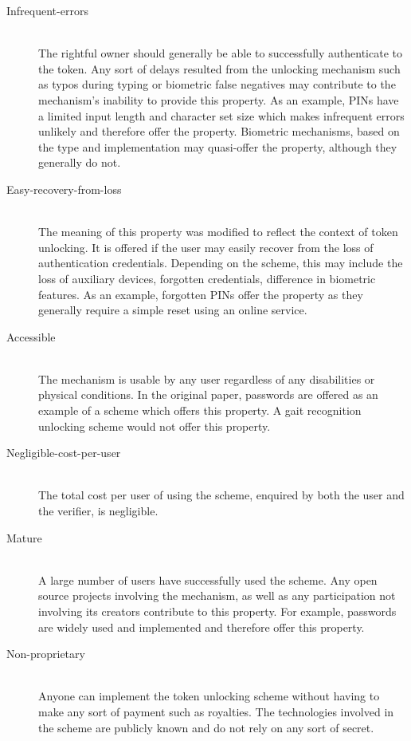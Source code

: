 \begin{description}
  \item[Infrequent-errors] \hfill \\
  The rightful owner should generally be able to successfully authenticate to the token. Any sort of delays resulted from the unlocking mechanism such as typos during typing or biometric false negatives may contribute to the mechanism's inability to provide this property. As an example, PINs have a limited input length and character set size which makes infrequent errors unlikely and therefore offer the property. Biometric mechanisms, based on the type and implementation may quasi-offer the property, although they generally do not.
    
  \item[Easy-recovery-from-loss] \hfill \\ 
  The meaning of this property was modified to reflect the context of token unlocking. It is offered if the user may easily recover from the loss of authentication credentials. Depending on the scheme, this may include the loss of auxiliary devices, forgotten credentials, difference in biometric features. As an example, forgotten PINs offer the property as they generally require a simple reset using an online service.
  
  \item[Accessible] \hfill \\
  The mechanism is usable by any user regardless of any disabilities or physical conditions. In the original paper, passwords are offered as an example of a scheme which offers this property. A gait recognition unlocking scheme would not offer this property. 
  
  \item[Negligible-cost-per-user] \hfill \\
  The total cost per user of using the scheme, enquired by both the user and the verifier, is negligible.
  
  \item[Mature] \hfill \\
  A large number of users have successfully used the scheme. Any open source projects involving the mechanism, as well as any participation not involving its creators contribute to this property. For example, passwords are widely used and implemented and therefore offer this property.
  
  \item[Non-proprietary] \hfill \\
  Anyone can implement the token unlocking scheme without having to make any sort of payment such as royalties. The technologies involved in the scheme are publicly known and do not rely on any sort of secret.
  

\end{description}
